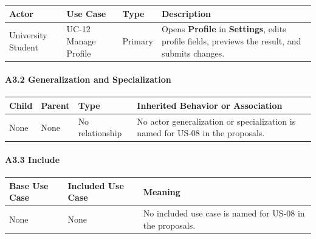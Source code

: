 \documentclass[12pt]{article}
\renewcommand{\baselinestretch}{1.5}
\begin{document}
\begingroup
\small
\renewcommand{\baselinestretch}{1.0}\selectfont
\renewcommand{\arraystretch}{1.15}
\setlength{\tabcolsep}{6pt}
\begin{longtable}{|>{\raggedright\arraybackslash}p{}|>{\raggedright\arraybackslash}p{}|>{\raggedright\arraybackslash}p{}|>{\raggedright\arraybackslash}p{}|}
\hline
\textbf{Actor} & \textbf{Use Case} & \textbf{Type} & \textbf{Description} \\ \hline
\endhead
University Student & UC-12 Manage Profile & Primary & Opens \textbf{Profile} in \textbf{Settings}, edits profile fields, previews the result, and submits changes. \\ \hline
\end{longtable}
\endgroup
\par\medskip

\hypertarget{sec:a3-2-generalization-and-specialization}{}
\paragraph*{A3.2 Generalization and Specialization}
\par\medskip

\begingroup
\small
\renewcommand{\baselinestretch}{1.0}\selectfont
\renewcommand{\arraystretch}{1.15}
\setlength{\tabcolsep}{6pt}
\begin{longtable}{|>{\raggedright\arraybackslash}p{}|>{\raggedright\arraybackslash}p{}|>{\raggedright\arraybackslash}p{}|>{\raggedright\arraybackslash}p{}|}
\hline
\textbf{Child} & \textbf{Parent} & \textbf{Type} & \textbf{Inherited Behavior or Association} \\ \hline
\endhead
None & None & No relationship & No actor generalization or specialization is named for US-08 in the proposals. \\ \hline
\end{longtable}
\endgroup
\par\medskip

\hypertarget{sec:a3-3-include}{}
\paragraph*{A3.3 Include}
\par\medskip

\begingroup
\small
\renewcommand{\baselinestretch}{1.0}\selectfont
\renewcommand{\arraystretch}{1.15}
\setlength{\tabcolsep}{6pt}
\begin{longtable}{|>{\raggedright\arraybackslash}p{}|>{\raggedright\arraybackslash}p{}|>{\raggedright\arraybackslash}p{}|}
\hline
\textbf{Base Use Case} & \textbf{Included Use Case} & \textbf{Meaning} \\ \hline
\endhead
None & None & No included use case is named for US-08 in the proposals. \\ \hline
\end{longtable}
\endgroup
\par\medskip
\end{document}
